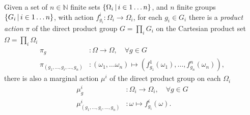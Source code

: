 Given a set of $n\in\mathbb{N}$ finite sets $\left\{\Omega_i\,\middle|\,i\in 1\hdots n\right\}$, and $n$ finite groups $\left\{G_i\,\middle|\,i\in 1\hdots n\right\}$, with action $f_{g_i}^i: \Omega_i \to \Omega_i$, for each $g_i\in G_i$ there is a \emph{product action} $\pi$ of the direct product group $G = \prod_i G_i$ on the Cartesian product set $\Omega = \prod_i \Omega_i$
\begin{align}
  \pi_g&: \Omega \to \Omega, \quad \forall g\in G\\
  \pi_{(g_1, \hdots, g_i,\hdots, g_n)} &: (\omega_1, \hdots \omega_n) \mapsto (f_{g_1}^1(\omega_1), \hdots, f_{g_n}^n(\omega_n)),
\end{align}
there is also a marginal action $\mu^i$ of the direct product group on each $\Omega_i$
\begin{align}
  \mu^i_g &:\Omega_i \to \Omega_i, \quad \forall g\in G\\
  \mu^i_{(g_1,\hdots, g_i,\hdots,g_n)}&:\omega\mapsto f^i_{g_i}(\omega).
\end{align}

